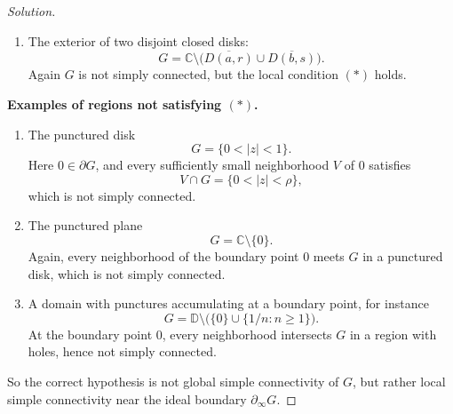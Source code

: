 \documentclass[12pt, a4paper]{report}
\theoremstyle{spaced}
\begin{document}
\begin{proof}[Solution]
\begin{enumerate}
		\item The exterior of two disjoint closed disks:
		      \[
			      G=\mathbb C\setminus \bigl(\overline{D(a,r)}\cup \overline{D(b,s)}\bigr).
		      \]
		      Again \(G\) is not simply connected, but the local condition \((*)\) holds.
	\end{enumerate}

	\medskip
	\textbf{Examples of regions not satisfying \((*)\).}
	\begin{enumerate}
		\item The punctured disk
		      \[
			      G=\{0<|z|<1\}.
		      \]
		      Here \(0\in \partial G\), and every sufficiently small neighborhood \(V\) of \(0\) satisfies
		      \[
			      V\cap G=\{0<|z|<\rho\},
		      \]
		      which is not simply connected.

		\item The punctured plane
		      \[
			      G=\mathbb C\setminus\{0\}.
		      \]
		      Again, every neighborhood of the boundary point \(0\) meets \(G\) in a punctured disk, which is not simply connected.

		\item A domain with punctures accumulating at a boundary point, for instance
		      \[
			      G=\mathbb D\setminus \bigl(\{0\}\cup\{1/n:n\ge 1\}\bigr).
		      \]
		      At the boundary point \(0\), every neighborhood intersects \(G\) in a region with holes, hence not simply connected.
	\end{enumerate}

	So the correct hypothesis is not global simple connectivity of \(G\), but rather local simple connectivity near the ideal boundary \(\partial_\infty G\).
\end{proof}
\end{document}
